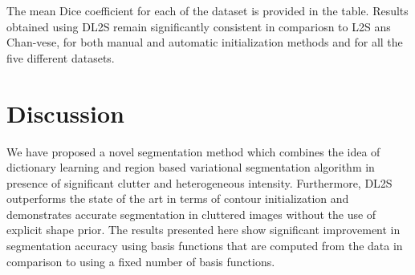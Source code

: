 The mean Dice coefficient for each of the dataset is provided in the table. Results obtained using DL2S remain significantly consistent in compariosn to L2S ans Chan-vese, for both manual and automatic initialization methods and for all the five different datasets.  

\section{Discussion}
We have proposed a novel segmentation method which combines the idea of dictionary learning and region based variational segmentation algorithm in presence of significant clutter and heterogeneous intensity. Furthermore, DL2S outperforms the state of the art in terms of contour initialization and demonstrates accurate segmentation in cluttered images without the use of explicit shape prior. The results presented here show significant improvement in segmentation accuracy using basis functions that are computed from the data in comparison to using a fixed number of basis functions.

